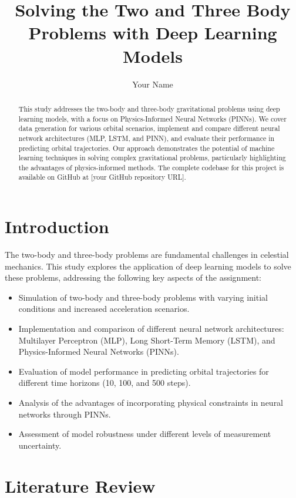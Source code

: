 \documentclass[12pt,a4paper]{article}
\title{Solving the Two and Three Body Problems with Deep Learning Models}
\author{Your Name}
\date{}
\begin{document}
\maketitle

\begin{abstract}
  This study addresses the two-body and three-body gravitational problems using deep learning models, with a focus on Physics-Informed Neural Networks (PINNs). We cover data generation for various orbital scenarios, implement and compare different neural network architectures (MLP, LSTM, and PINN), and evaluate their performance in predicting orbital trajectories. Our approach demonstrates the potential of machine learning techniques in solving complex gravitational problems, particularly highlighting the advantages of physics-informed methods. The complete codebase for this project is available on GitHub at [your GitHub repository URL].
  \end{abstract}

  \section{Introduction}
  \label{sec:introduction}
  The two-body and three-body problems are fundamental challenges in celestial mechanics. This study explores the application of deep learning models to solve these problems, addressing the following key aspects of the assignment:

  \begin{itemize}
      \item Simulation of two-body and three-body problems with varying initial conditions and increased acceleration scenarios.
      \item Implementation and comparison of different neural network architectures: Multilayer Perceptron (MLP), Long Short-Term Memory (LSTM), and Physics-Informed Neural Networks (PINNs).
      \item Evaluation of model performance in predicting orbital trajectories for different time horizons (10, 100, and 500 steps).
      \item Analysis of the advantages of incorporating physical constraints in neural networks through PINNs.
      \item Assessment of model robustness under different levels of measurement uncertainty.
  \end{itemize}

\section{Literature Review}
\label{sec:literature}
\end{document}

